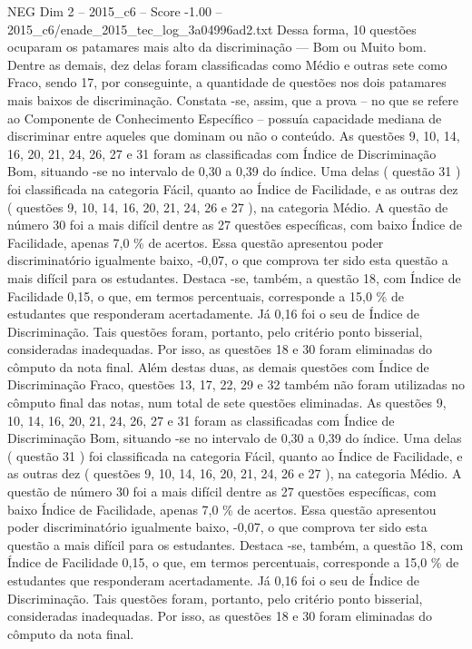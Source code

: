 \begin{textsample}{NEG Dim 2 – 2015\_c6 – Score -1.00 – 2015\_c6/enade\_2015\_tec\_log\_3a04996ad2.txt}
Dessa forma, 10 questões ocuparam os patamares mais alto da discriminação — Bom ou Muito bom.
Dentre as demais, dez delas foram classificadas como Médio e outras sete como Fraco, sendo 17, por conseguinte, a quantidade de questões nos dois patamares mais baixos de discriminação.
Constata -se, assim, que a prova – no que se refere ao Componente de Conhecimento Específico – possuía capacidade mediana de discriminar entre aqueles que dominam ou não o conteúdo.
As questões 9, 10, 14, 16, 20, 21, 24, 26, 27 e 31 foram as classificadas com Índice de Discriminação Bom, situando -se no intervalo de 0,30 a 0,39 do índice.
Uma delas ( questão 31 ) foi classificada na categoria Fácil, quanto ao Índice de Facilidade, e as outras dez ( questões 9, 10, 14, 16, 20, 21, 24, 26 e 27 ), na categoria Médio.
A questão de número 30 foi a mais difícil dentre as 27 questões específicas, com baixo Índice de Facilidade, apenas 7,0 \% de acertos.
Essa questão apresentou poder discriminatório igualmente baixo, -0,07, o que comprova ter sido esta questão a mais difícil para os estudantes.
Destaca -se, também, a questão 18, com Índice de Facilidade 0,15, o que, em termos percentuais, corresponde a 15,0 \% de estudantes que responderam acertadamente.
Já 0,16 foi o seu de Índice de Discriminação.
Tais questões foram, portanto, pelo critério ponto bisserial, consideradas inadequadas.
Por isso, as questões 18 e 30 foram eliminadas do cômputo da nota final.
Além destas duas, as demais questões com Índice de Discriminação Fraco, questões 13, 17, 22, 29 e 32 também não foram utilizadas no cômputo final das notas, num total de sete questões eliminadas.
As questões 9, 10, 14, 16, 20, 21, 24, 26, 27 e 31 foram as classificadas com Índice de Discriminação Bom, situando -se no intervalo de 0,30 a 0,39 do índice.
Uma delas ( questão 31 ) foi classificada na categoria Fácil, quanto ao Índice de Facilidade, e as outras dez ( questões 9, 10, 14, 16, 20, 21, 24, 26 e 27 ), na categoria Médio.
A questão de número 30 foi a mais difícil dentre as 27 questões específicas, com baixo Índice de Facilidade, apenas 7,0 \% de acertos.
Essa questão apresentou poder discriminatório igualmente baixo, -0,07, o que comprova ter sido esta questão a mais difícil para os estudantes.
Destaca -se, também, a questão 18, com Índice de Facilidade 0,15, o que, em termos percentuais, corresponde a 15,0 \% de estudantes que responderam acertadamente.
Já 0,16 foi o seu de Índice de Discriminação.
Tais questões foram, portanto, pelo critério ponto bisserial, consideradas inadequadas.
Por isso, as questões 18 e 30 foram eliminadas do cômputo da nota final.

\end{textsample}
